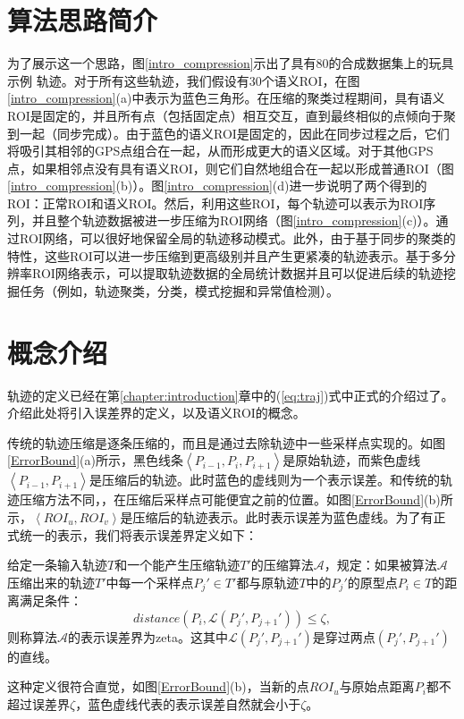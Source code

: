 \section{算法思路简介}
为了展示这一个思路，图\ref{intro_compression}示出了具有80的合成数据集上的玩具示例
轨迹。对于所有这些轨迹，我们假设有30个语义ROI，在图\ref{intro_compression}(a)中表示为蓝色三角形。在压缩的聚类过程期间，具有语义ROI是固定的，并且所有点（包括固定点）相互交互，直到最终相似的点倾向于聚到一起（同步完成）。由于蓝色的语义ROI是固定的，因此在同步过程之后，它们将吸引其相邻的GPS点组合在一起，从而形成更大的语义区域。对于其他GPS点，如果相邻点没有具有语义ROI，则它们自然地组合在一起以形成普通ROI（图\ref{intro_compression}(b)）。图\ref{intro_compression}(d)进一步说明了两个得到的ROI：正常ROI和语义ROI。然后，利用这些ROI，每个轨迹可以表示为ROI序列，并且整个轨迹数据被进一步压缩为ROI网络（图\ref{intro_compression}(c)）。通过ROI网络，可以很好地保留全局的轨迹移动模式。此外，由于基于同步的聚类的特性，这些ROI可以进一步压缩到更高级别并且产生更紧凑的轨迹表示。基于多分辨率ROI网络表示，可以提取轨迹数据的全局统计数据并且可以促进后续的轨迹挖掘任务（例如，轨迹聚类，分类，模式挖掘和异常值检测）。


\section{概念介绍}
轨迹的定义已经在第\ref{chapter:introduction}章中的(\ref{eq:traj})式中正式的介绍过了。介绍此处将引入误差界的定义，以及语义ROI的概念。


传统的轨迹压缩是逐条压缩的，而且是通过去除轨迹中一些采样点实现的。如图\ref{ErrorBound}(a)所示，黑色线条$\left<P_{i-1},P_{i},P_{i+1}\right>$是原始轨迹，而紫色虚线$\left<P_{i-1},P_{i+1}\right>$是压缩后的轨迹。此时蓝色的虚线则为一个表示误差。和传统的轨迹压缩方法不同，，在压缩后采样点可能便宜之前的位置。如图\ref{ErrorBound}(b)所示，$\left<ROI_{u},ROI_{v}\right>$是压缩后的轨迹表示。此时表示误差为蓝色虚线。为了有正式统一的表示，我们将表示误差界定义如下：

\begin{dingyi}[表示误差界]
给定一条输入轨迹$T$和一个能产生压缩轨迹$T'$的压缩算法$\mathcal{A}$，规定：如果被算法$\mathcal{A}$压缩出来的轨迹$T'$中每一个采样点$P_j' \in T'$都与原轨迹$T$中的$P_j'$的原型点$P_i \in T$的距离满足条件：
\begin{equation}
\label{eq:errorbound}
{distance}\left(P_i,\mathcal{L}(P_j',P_{j+1}')\right) \le \zeta,
\end{equation}
则称算法$\mathcal{A}$的表示误差界为\gls{zeta}。这其中$\mathcal{L}(P_j',P_{j+1}')$是穿过两点$(P_j',P_{j+1}')$的直线。
\end{dingyi}
这种定义很符合直觉，如图\ref{ErrorBound}(b)，当新的点$ROI_{u}$与原始点距离$P_i$都不超过误差界$\zeta$，蓝色虚线代表的表示误差自然就会小于$\zeta$。

